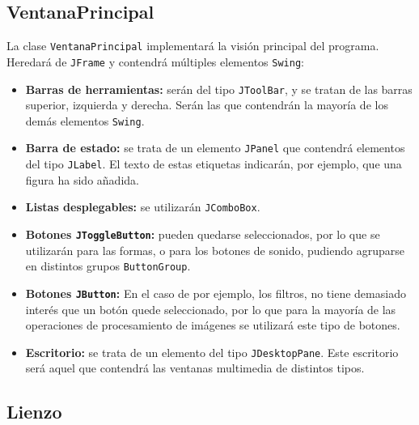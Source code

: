 \subsection{VentanaPrincipal}
La clase \texttt{VentanaPrincipal} implementará la visión principal del programa. Heredará de \texttt{JFrame} y contendrá múltiples elementos \texttt{Swing}:
\begin{itemize}
\item{\textbf{Barras de herramientas:} serán del tipo \texttt{JToolBar}, y se tratan de las barras superior, izquierda y derecha. Serán las que contendrán la mayoría de los demás elementos \texttt{Swing}.}
\item{\textbf{Barra de estado:} se trata de un elemento \texttt{JPanel} que contendrá elementos del tipo \texttt{JLabel}. El texto de estas etiquetas indicarán, por ejemplo, que una figura ha sido añadida.}
\item{\textbf{Listas desplegables:} se utilizarán \texttt{JComboBox}.}
\item{\textbf{Botones \texttt{JToggleButton}:} pueden quedarse seleccionados, por lo que se utilizarán para las formas, o para los botones de sonido, pudiendo agruparse en distintos grupos \texttt{ButtonGroup}.}
\item{\textbf{Botones \texttt{JButton}:} En el caso de por ejemplo, los filtros, no tiene demasiado interés que un botón quede seleccionado, por lo que para la mayoría de las operaciones de procesamiento de imágenes se utilizará este tipo de botones.}
\item{\textbf{Escritorio:} se trata de un elemento del tipo \texttt{JDesktopPane}. Este escritorio será aquel que contendrá las ventanas multimedia de distintos tipos.}
\end{itemize}

\subsection{Lienzo}

